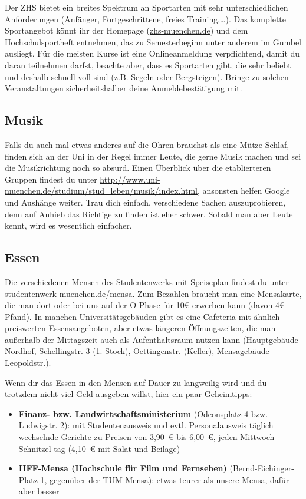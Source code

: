 Der ZHS bietet ein breites Spektrum an Sportarten mit sehr unterschiedlichen Anforderungen (Anfänger, Fortgeschrittene, freies Training,\ldots). Das komplette Sportangebot könnt ihr der Homepage (\url{zhs-muenchen.de}) und dem Hochschulsportheft entnehmen, das zu Semesterbeginn unter anderem im Gumbel ausliegt. Für die meisten Kurse ist eine Onlineanmeldung verpflichtend, damit du daran teilnehmen darfst, beachte aber, dass es Sportarten gibt, die sehr beliebt und deshalb schnell voll sind (z.B. Segeln oder Bergsteigen). Bringe zu solchen Veranstaltungen sicherheitshalber deine Anmeldebestätigung mit.


\subsection{Musik}
Falls du auch mal etwas anderes auf die Ohren brauchst als eine Mütze Schlaf, finden sich an der Uni in der Regel immer Leute, die gerne Musik machen und sei die Musikrichtung noch so absurd. Einen Überblick über die etablierteren Gruppen findest du unter \url{http://www.uni-muenchen.de/studium/stud_leben/musik/index.html}, ansonsten helfen Google und Aushänge weiter. Trau dich einfach, verschiedene Sachen auszuprobieren, denn auf Anhieb das Richtige zu finden ist eher schwer. Sobald man aber Leute kennt, wird es wesentlich einfacher.




\subsection{Essen}

Die verschiedenen Mensen des Studentenwerks mit Speiseplan findest du unter \url{studentenwerk-muenchen.de/mensa}. Zum Bezahlen braucht man eine Mensakarte, die man dort oder bei uns auf der O-Phase für 10€ erwerben kann (davon 4€ Pfand). In manchen Universitätsgebäuden gibt es eine Cafeteria mit ähnlich preiswerten Essensangeboten, aber etwas längeren Öffnungszeiten, die man außerhalb der Mittagszeit auch als Aufenthaltsraum nutzen kann (Hauptgebäude Nordhof, Schellingstr. 3 (1. Stock), Oettingenstr. (Keller), Mensagebäude Leopoldstr.).

Wenn dir das Essen in den Mensen auf Dauer zu langweilig wird und du trotzdem nicht viel Geld ausgeben willst, hier ein paar Geheimtipps:

\begin{itemize}
	\item \textbf{Finanz- bzw. Landwirtschaftsministerium} (Odeonsplatz 4 bzw. Ludwigstr. 2): mit Studentenausweis 		und evtl. Personalausweis täglich wechselnde Gerichte zu Preisen von 3,90~€ bis 6,00~€, jeden Mittwoch Schnitzel		tag (4,10~€ mit Salat und Beilage)
	
	\item \textbf{HFF-Mensa (Hochschule für Film und Fernsehen)}
          (Bernd-Eichinger-Platz 1, gegenüber der TUM-Mensa): etwas
          teurer als unsere Mensa, dafür aber besser
\end{itemize}
